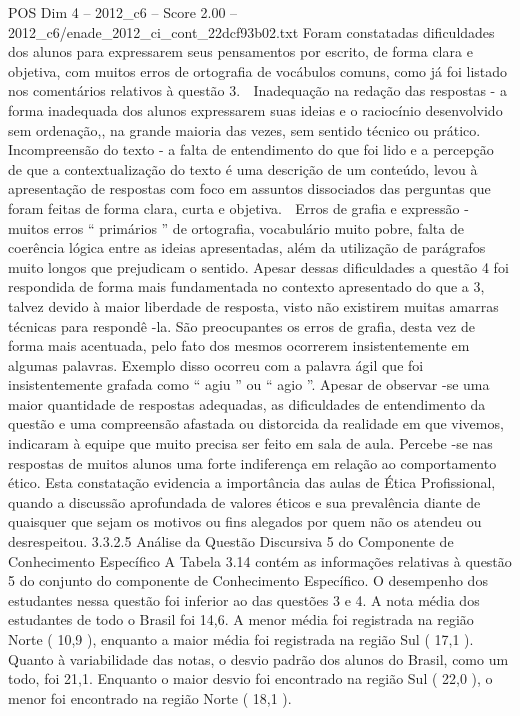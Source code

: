 \begin{textsample}{POS Dim 4 – 2012\_c6 – Score 2.00 – 2012\_c6/enade\_2012\_ci\_cont\_22dcf93b02.txt}
Foram constatadas dificuldades dos alunos para expressarem seus pensamentos por escrito, de forma clara e objetiva, com muitos erros de ortografia de vocábulos comuns, como já foi listado nos comentários relativos à questão 3.  Inadequação na redação das respostas - a forma inadequada dos alunos expressarem suas ideias e o raciocínio desenvolvido sem ordenação,, na grande maioria das vezes, sem sentido técnico ou prático.  Incompreensão do texto - a falta de entendimento do que foi lido e a percepção de que a contextualização do texto é uma descrição de um conteúdo, levou à apresentação de respostas com foco em assuntos dissociados das perguntas que foram feitas de forma clara, curta e objetiva.  Erros de grafia e expressão - muitos erros “ primários ” de ortografia, vocabulário muito pobre, falta de coerência lógica entre as ideias apresentadas, além da utilização de parágrafos muito longos que prejudicam o sentido.
Apesar dessas dificuldades a questão 4 foi respondida de forma mais fundamentada no contexto apresentado do que a 3, talvez devido à maior liberdade de resposta, visto não existirem muitas amarras técnicas para respondê -la.
São preocupantes os erros de grafia, desta vez de forma mais acentuada, pelo fato dos mesmos ocorrerem insistentemente em algumas palavras.
Exemplo disso ocorreu com a palavra ágil que foi insistentemente grafada como “ agiu ” ou “ agio ”.
Apesar de observar -se uma maior quantidade de respostas adequadas, as dificuldades de entendimento da questão e uma compreensão afastada ou distorcida da realidade em que vivemos, indicaram à equipe que muito precisa ser feito em sala de aula.
Percebe -se nas respostas de muitos alunos uma forte indiferença em relação ao comportamento ético.
Esta constatação evidencia a importância das aulas de Ética Profissional, quando a discussão aprofundada de valores éticos e sua prevalência diante de quaisquer que sejam os motivos ou fins alegados por quem não os atendeu ou desrespeitou. 3.3.2.5 Análise da Questão Discursiva 5 do Componente de Conhecimento Específico A Tabela 3.14 contém as informações relativas à questão 5 do conjunto do componente de Conhecimento Específico.
O desempenho dos estudantes nessa questão foi inferior ao das questões 3 e 4.
A nota média dos estudantes de todo o Brasil foi 14,6.
A menor média foi registrada na região Norte ( 10,9 ), enquanto a maior média foi registrada na região Sul ( 17,1 ).
Quanto à variabilidade das notas, o desvio padrão dos alunos do Brasil, como um todo, foi 21,1.
Enquanto o maior desvio foi encontrado na região Sul ( 22,0 ), o menor foi encontrado na região Norte ( 18,1 ).

\end{textsample}
